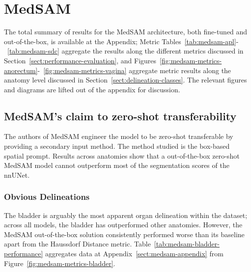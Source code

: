 \documentclass[11pt,twoside]{report}
\begin{document}
\clearpage

\section{MedSAM}

The total summary of results for the MedSAM architecture, both fine-tuned and out-of-the-box, is available at the Appendix; Metric Tables~\ref{tab:medsam-apl}-~\ref{tab:medsam-sdc} aggregate the results along the different metrics discussed in Section~\ref{sect:performance-evaluation}, and Figures~\ref{fig:medsam-metrics-anorectum}-~\ref{fig:medsam-metrics-vagina} aggregate metric results along the anatomy level discussed in Section~\ref{sect:delineation-classes}. The relevant figures and diagrams are lifted out of the appendix for discussion.

\subsection{MedSAM's claim to zero-shot transferability}

The authors of MedSAM engineer the model to be zero-shot transferable by providing a secondary input method. The method studied is the box-based spatial prompt. Results across anatomies show that a out-of-the-box zero-shot MedSAM model cannot outperform most of the segmentation scores of the nnUNet.

\subsubsection{Obvious Delineations}\label{sec:medsam-ootb-obvious-delineations}

The bladder is arguably the most apparent organ delineation within the dataset; across all models, the bladder has outperformed other anatomies. However, the MedSAM out-of-the-box solution consistently performed worse than its baseline apart from the Haussdorf Distance metric. Table~\ref{tab:medsam-bladder-performance} aggregates data at Appendix~\ref{sect:medsam-appendix} from Figure~\ref{fig:medsam-metrics-bladder}.
\end{document}
